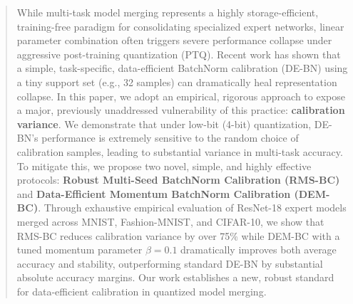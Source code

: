 \documentclass{article}
\begin{document}

\printAffiliationsAndNotice{}

\begin{abstract}
While multi-task model merging represents a highly storage-efficient, training-free paradigm for consolidating specialized expert networks, linear parameter combination often triggers severe performance collapse under aggressive post-training quantization (PTQ). Recent work has shown that a simple, task-specific, data-efficient BatchNorm calibration (DE-BN) using a tiny support set (e.g., 32 samples) can dramatically heal representation collapse. In this paper, we adopt an empirical, rigorous approach to expose a major, previously unaddressed vulnerability of this practice: \textbf{calibration variance}. We demonstrate that under low-bit (4-bit) quantization, DE-BN's performance is extremely sensitive to the random choice of calibration samples, leading to substantial variance in multi-task accuracy. To mitigate this, we propose two novel, simple, and highly effective protocols: \textbf{Robust Multi-Seed BatchNorm Calibration (RMS-BC)} and \textbf{Data-Efficient Momentum BatchNorm Calibration (DEM-BC)}. Through exhaustive empirical evaluation of ResNet-18 expert models merged across MNIST, Fashion-MNIST, and CIFAR-10, we show that RMS-BC reduces calibration variance by over 75\% while DEM-BC with a tuned momentum parameter $\beta = 0.1$ dramatically improves both average accuracy and stability, outperforming standard DE-BN by substantial absolute accuracy margins. Our work establishes a new, robust standard for data-efficient calibration in quantized model merging.
\end{abstract}
\end{document}
